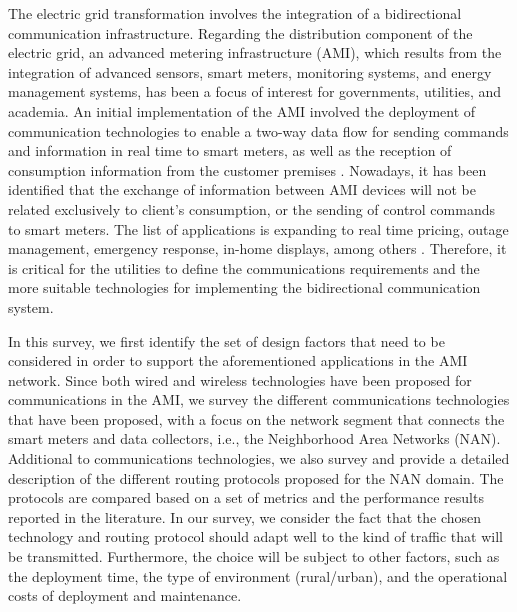 \documentclass[11pt,draftclsnofoot,onecolumn]{IEEEtran}
\begin{document}
 The electric grid transformation involves the integration of a bidirectional communication infrastructure. Regarding the distribution component of the electric grid, an advanced metering infrastructure (AMI), which results from the integration of advanced sensors, smart meters, monitoring systems, and energy management systems, has been a focus of interest for governments, utilities, and academia. An initial implementation of the AMI involved the deployment of communication technologies to enable a two-way data flow for sending commands and information in real time to smart meters, as well as the reception of consumption information from the customer premises \cite{Deconinck2008}. Nowadays, it has been identified that the exchange of information between AMI devices will not be related exclusively to client's consumption, or the sending of control commands to smart meters. The list of applications is expanding to real time pricing, outage management, emergency response, in-home displays, among others \cite{Rajalingham2013}. Therefore, it is critical for the utilities to define the communications requirements and the more suitable technologies for implementing the bidirectional communication system. 
 
In this survey, we first identify the set of design factors that need to be considered in order to support the aforementioned applications in the AMI network. Since both wired and wireless technologies have been proposed for communications in the AMI, we survey the different communications technologies that have been proposed, with a focus on the network segment that connects the smart meters and data collectors, i.e., the Neighborhood Area Networks (NAN). Additional to communications technologies, we also survey and provide a  detailed description of the different routing protocols proposed for the NAN domain. The protocols are compared based on a set of metrics and the performance results reported in the literature. In our survey, we consider the fact that the chosen technology and routing protocol should adapt well to the kind of traffic that will be transmitted. Furthermore, the choice will be subject to other factors, such as the deployment time, the type of environment (rural/urban), and the operational costs of deployment and maintenance.
\end{document}
